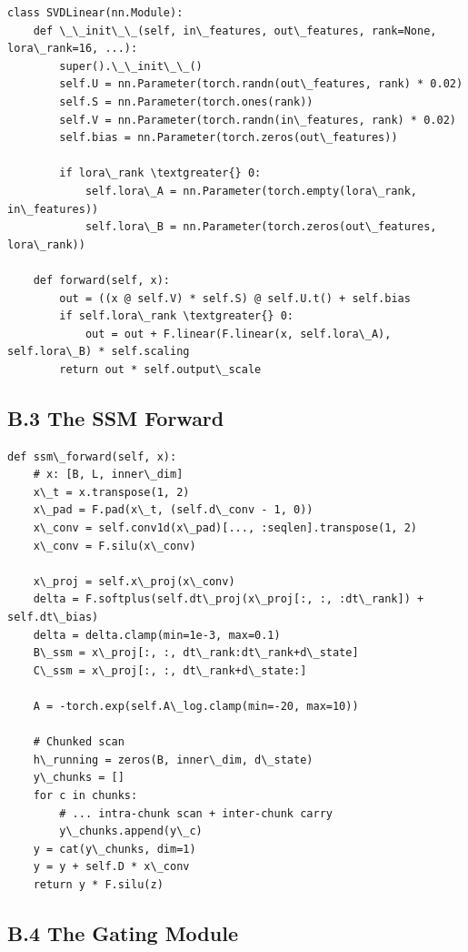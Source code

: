 \begin{lstlisting}
class SVDLinear(nn.Module):
    def \_\_init\_\_(self, in\_features, out\_features, rank=None, lora\_rank=16, ...):
        super().\_\_init\_\_()
        self.U = nn.Parameter(torch.randn(out\_features, rank) * 0.02)
        self.S = nn.Parameter(torch.ones(rank))
        self.V = nn.Parameter(torch.randn(in\_features, rank) * 0.02)
        self.bias = nn.Parameter(torch.zeros(out\_features))
        
        if lora\_rank \textgreater{} 0:
            self.lora\_A = nn.Parameter(torch.empty(lora\_rank, in\_features))
            self.lora\_B = nn.Parameter(torch.zeros(out\_features, lora\_rank))
    
    def forward(self, x):
        out = ((x @ self.V) * self.S) @ self.U.t() + self.bias
        if self.lora\_rank \textgreater{} 0:
            out = out + F.linear(F.linear(x, self.lora\_A), self.lora\_B) * self.scaling
        return out * self.output\_scale
\end{lstlisting}

\subsection{B.3 The SSM Forward}

\begin{lstlisting}
def ssm\_forward(self, x):
    # x: [B, L, inner\_dim]
    x\_t = x.transpose(1, 2)
    x\_pad = F.pad(x\_t, (self.d\_conv - 1, 0))
    x\_conv = self.conv1d(x\_pad)[..., :seqlen].transpose(1, 2)
    x\_conv = F.silu(x\_conv)
    
    x\_proj = self.x\_proj(x\_conv)
    delta = F.softplus(self.dt\_proj(x\_proj[:, :, :dt\_rank]) + self.dt\_bias)
    delta = delta.clamp(min=1e-3, max=0.1)
    B\_ssm = x\_proj[:, :, dt\_rank:dt\_rank+d\_state]
    C\_ssm = x\_proj[:, :, dt\_rank+d\_state:]
    
    A = -torch.exp(self.A\_log.clamp(min=-20, max=10))
    
    # Chunked scan
    h\_running = zeros(B, inner\_dim, d\_state)
    y\_chunks = []
    for c in chunks:
        # ... intra-chunk scan + inter-chunk carry
        y\_chunks.append(y\_c)
    y = cat(y\_chunks, dim=1)
    y = y + self.D * x\_conv
    return y * F.silu(z)
\end{lstlisting}

\subsection{B.4 The Gating Module}

